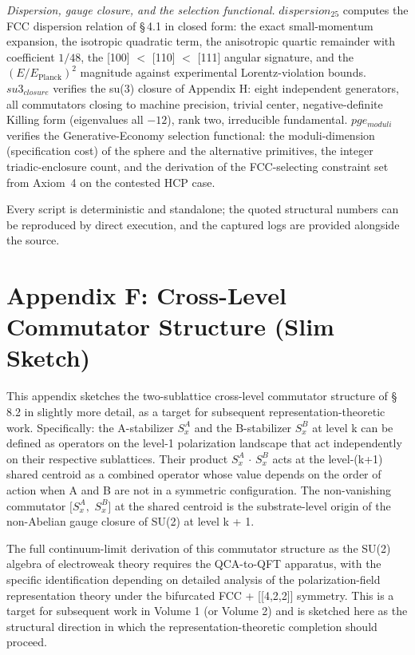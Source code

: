 \documentclass[11pt,oneside]{report}
\theoremstyle{definition}
\theoremstyle{remark}
\begin{document}
\emph{Dispersion, gauge closure, and the selection functional.}
\ensuremath{dispersion_{25}} computes the FCC dispersion relation of \S\,4.1 in closed form:
the exact small-momentum expansion, the isotropic quadratic term, the anisotropic
quartic remainder with coefficient \ensuremath{1/48}, the [100] \ensuremath{<} [110] \ensuremath{<} [111] angular
signature, and the \ensuremath{(E/E_{\mathrm{Planck}})^{2}} magnitude against experimental
Lorentz-violation bounds. \ensuremath{su3_{closure}} verifies the su(3) closure of Appendix H:
eight independent generators, all commutators closing to machine precision,
trivial center, negative-definite Killing form (eigenvalues all \ensuremath{-12}), rank two,
irreducible fundamental. \ensuremath{pge_{moduli}} verifies the Generative-Economy selection
functional: the moduli-dimension (specification cost) of the sphere and the
alternative primitives, the integer triadic-enclosure count, and the derivation
of the FCC-selecting constraint set from Axiom~4 on the contested HCP case.

Every script is deterministic and standalone; the quoted structural
numbers can be reproduced by direct execution, and the captured logs are
provided alongside the source.

\section*{Appendix F: Cross-Level Commutator Structure (Slim Sketch)}

This appendix sketches the two-sublattice cross-level commutator
structure of \S\,8.2 in slightly more detail, as a target for subsequent
representation-theoretic work. Specifically: the A-stabilizer \ensuremath{S_{x}^{A}}
and the B-stabilizer \ensuremath{S_{x}^{B}} at level k can be defined as operators on
the level-1 polarization landscape that act independently on their
respective sublattices. Their product \ensuremath{S_{x}^{A}} \ensuremath{\cdot} \ensuremath{S_{x}^{B}} acts at the
level-(k+1) shared centroid as a combined operator whose value depends
on the order of action when A and B are not in a symmetric
configuration. The non-vanishing commutator \ensuremath{[S_{x}^{A},} \ensuremath{S_{x}^{B}]} at
the shared centroid is the substrate-level origin of the non-Abelian
gauge closure of SU(2) at level k + 1.

The full continuum-limit derivation of this commutator structure as the
SU(2) algebra of electroweak theory requires the QCA-to-QFT apparatus,
with the specific identification depending on detailed analysis of the
polarization-field representation theory under the bifurcated FCC +
[[4,2,2]] symmetry. This is a target for subsequent work in
Volume 1 (or Volume 2) and is sketched here as the structural direction
in which the representation-theoretic completion should proceed.
\end{document}
